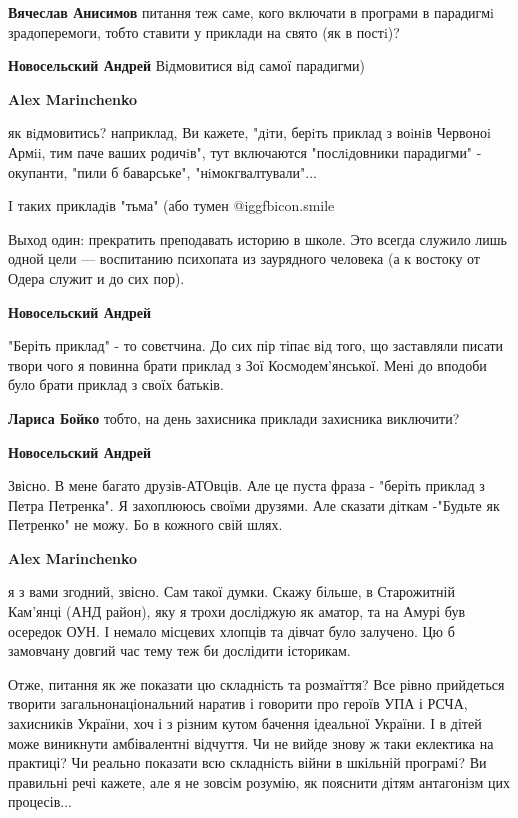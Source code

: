 \begin{itemize}
\begin{itemize}
\textbf{Вячеслав Анисимов} питання теж саме, кого включати в програми в парадигмi зрадоперемоги, тобто ставити у приклади на свято (як в постi)?

\textbf{Новосельский Андрей} Відмовитися від самої парадигми)

\textbf{Alex Marinchenko} 

як вiдмовитись? наприклад, Ви кажете, "дiти, берiть приклад з воiнiв Червоноi
Армii, тим паче ваших родичiв", тут включаются "послiдовники парадигми" -
окупанти, "пили б баварське", "нiмокгвалтували"...

I таких прикладiв "тьма" (або тумен  @igg{fbicon.smile} 


Выход один: прекратить преподавать историю в школе. Это всегда служило лишь
одной цели — воспитанию психопата из заурядного человека (а к востоку от Одера
служит и до сих пор).

\textbf{Новосельский Андрей} 

"Беріть приклад" - то совєтчина. До сих пір тіпає від того, що заставляли
писати твори чого я повинна брати приклад з Зої Космодем'янської. Мені до
вподоби було брати приклад з своїх батьків.

\textbf{Лариса Бойко} тобто, на день захисника приклади захисника виключити?

\textbf{Новосельский Андрей} 

Звісно. В мене багато друзів-АТОвців. Але це пуста фраза - "беріть приклад з
Петра Петренка". Я захоплююсь своїми друзями. Але сказати діткам -"Будьте як
Петренко" не можу. Бо в кожного свій шлях.

\textbf{Alex Marinchenko} 

я з вами згодний, звісно. Сам такої думки. Скажу більше, в Старожитній Кам'янці
(АНД район), яку я трохи досліджую як аматор, та на Амурі був осередок ОУН. І
немало місцевих хлопців та дівчат було залучено. Цю б замовчану довгий час тему
теж би дослідити історикам.

Отже, питання як же показати цю складність та розмаїття? Все рівно прийдеться
творити загальнонаціональний наратив і говорити про героїв УПА і РСЧА,
захисників України, хоч і з різним кутом бачення ідеальної України. І в дітей
може виникнути амбівалентні відчуття. Чи не вийде знову ж таки еклектика на
практиці? Чи реально показати всю складність війни в шкільній програмі? Ви
правильні речі кажете, але я не зовсім розумію, як пояснити дітям антагонізм
цих процесів...


\end{itemize}
\end{itemize}
